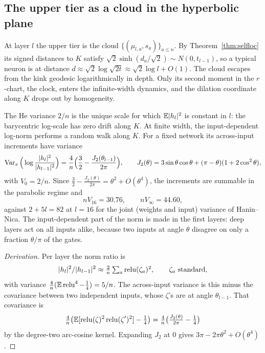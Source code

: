 \subsection{The upper tier as a cloud in the hyperbolic plane}
At layer $l$ the upper tier is the cloud $\{(\mu_{l,a},s_a)\}_{a\le n}$. By Theorem~\ref{thm:selfloc} its signed distances to $K$ satisfy
$\sqrt2\sinh(d_a/\sqrt2)\sim N(0,t_{l-1})$, so a typical neuron is at distance $d\approx\sqrt2\log\sqrt{2t}\approx\sqrt2\log l+O(1)$. The cloud
escapes from the kink geodesic logarithmically in depth. Only its second moment in the $r$-chart, the clock, enters the infinite-width
dynamics, and the dilation coordinate along $K$ drops out by homogeneity.
\begin{proposition}\label{prop:diffusion}
The He variance $2/n$ is the unique scale for which $\mathbb E|h_l|^2$ is constant in $l$: the barycentric log-scale has zero drift along
$K$. At finite width, the input-dependent log-norm performs a random walk along $K$. For a fixed network its across-input increments
have variance
\[
\operatorname{Var}_x\Big(\log\frac{|h_l|^2}{|h_{l-1}|^2}\Big)=\frac4n\Big(\frac32-\frac{J_2(\theta_{l-1})}{2\pi}\Big),\qquad J_2(\theta)=3\sin\theta\cos\theta+(\pi-\theta)(1+2\cos^2\theta),
\]
with $V_0=2/n$. Since $\frac32-\frac{J_2(\theta)}{2\pi}=\theta^2+O(\theta^4)$, the increments are summable in the parabolic regime and
\[
nV_{16}=30.76,\qquad nV_\infty=44.60,
\]
against $2+5l=82$ at $l=16$ for the joint (weights and input) variance of Hanin--Nica. The input-dependent part of the norm is made in
the first layers: deep layers act on all inputs alike, because two inputs at angle $\theta$ disagree on only a fraction $\theta/\pi$ of
the gates.
\end{proposition}
\begin{proof}[Derivation]
Per layer the norm ratio is
\[
|h_l|^2/|h_{l-1}|^2\approx\tfrac2n\textstyle\sum_a\relu(\zeta_a)^2,\qquad\zeta_a\ \text{standard},
\]
with variance $\frac4n(\mathbb E\operatorname{relu}^4-\frac14)=5/n$.
The across-input variance is this minus the covariance between two independent inputs, whose $\zeta$'s are at angle $\theta_{l-1}$. That
covariance is
\[
\tfrac4n\big(\mathbb E[\operatorname{relu}(\zeta)^2\operatorname{relu}(\zeta')^2]-\tfrac14\big)=\tfrac4n\big(\tfrac{J_2(\theta)}{2\pi}-\tfrac14\big)
\]
by the degree-two arc-cosine kernel.
Expanding $J_2$ at $0$ gives $3\pi-2\pi\theta^2+O(\theta^4)$.
\end{proof}


